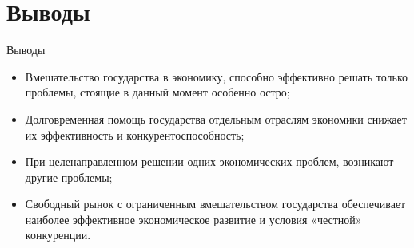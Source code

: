 \documentclass{beamer}
\begin{document}
	\section{Выводы}

	\begin{frame}{Выводы}
		\begin{itemize}
			\item Вмешательство государства в экономику, способно эффективно решать только проблемы, стоящие в данный момент особенно остро;
			\item Долговременная помощь государства отдельным отраслям экономики снижает их эффективность и конкурентоспособность;
			\item При целенаправленном решении одних экономических проблем, возникают другие проблемы;
			\item Свободный рынок с ограниченным вмешательством государства обеспечивает наиболее эффективное экономическое развитие и условия «честной» конкуренции.
		\end{itemize}
	\end{frame}
\end{document}
